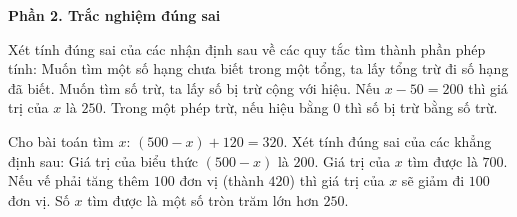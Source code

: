 \textbf{Phần 2. Trắc nghiệm đúng sai}

\begin{ex} %
Xét tính đúng sai của các nhận định sau về các quy tắc tìm thành phần phép tính:
\choiceTF
{\True Muốn tìm một số hạng chưa biết trong một tổng, ta lấy tổng trừ đi số hạng đã biết.}
{Muốn tìm số trừ, ta lấy số bị trừ cộng với hiệu.}
{\True Nếu $x - 50 = 200$ thì giá trị của $x$ là $250$.}
{\True Trong một phép trừ, nếu hiệu bằng $0$ thì số bị trừ bằng số trừ.}
\end{ex}

\begin{ex} %
Cho bài toán tìm $x$: $(500 - x) + 120 = 320$. Xét tính đúng sai của các khẳng định sau:
\choiceTF
{\True Giá trị của biểu thức $(500 - x)$ là $200$.}
{Giá trị của $x$ tìm được là $700$.}
{\True Nếu vế phải tăng thêm $100$ đơn vị (thành $420$) thì giá trị của $x$ sẽ giảm đi $100$ đơn vị.}
{\True Số $x$ tìm được là một số tròn trăm lớn hơn $250$.}
\end{ex}

